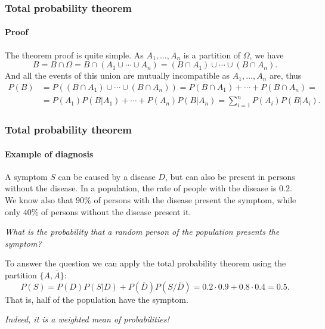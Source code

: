 \begin{frame}
\frametitle{Total probability theorem}
\framesubtitle{Proof}
The theorem proof is quite simple.
As $A_1,\ldots,A_n$ is a partition of $\Omega$, we have 
\[
B = B\cap \Omega = B\cap (A_1\cup \cdots \cup A_n) = (B\cap A_1)\cup \cdots \cup (B\cap A_n).
\]
And all the events of this union are mutually incompatible as $A_1,\ldots,A_n$ are, thus
\begin{align*}
P(B) &= P((B\cap A_1)\cup \cdots \cup (B\cap A_n)) = P(B\cap A_1)+\cdots + P(B\cap A_n) =\\
&= P(A_1)P(B|A_1)+\cdots + P(A_n)P(B|A_n) = \sum_{i=1}^n P(A_i)P(B|A_i).
\end{align*}

\begin{center}
\end{center}
\end{frame}


\begin{frame}
\frametitle{Total probability theorem}
\framesubtitle{Example of diagnosis}
A symptom $S$ can be caused by a disease $D$, but can also be present in persons without the disease.
In a population, the rate of people with the disease is $0.2$. 
We know also that $90\%$ of persons with the disease present the symptom, while only $40\%$ of persons without the
disease present it. 

\emph{What is the probability that a random person of the population presents the symptom?}

To answer the question we can apply the total probability theorem using the partition $\{A,\bar A\}$:
\[
P(S) = P(D)P(S|D)+P(\bar D)P(S/\bar D) = 0.2\cdot 0.9 + 0.8\cdot 0.4 = 0.5.
\]
That is, half of the population have the symptom. 

\begin{center}
\emph{Indeed, it is a weighted mean of probabilities!}
\end{center}
\end{frame}


